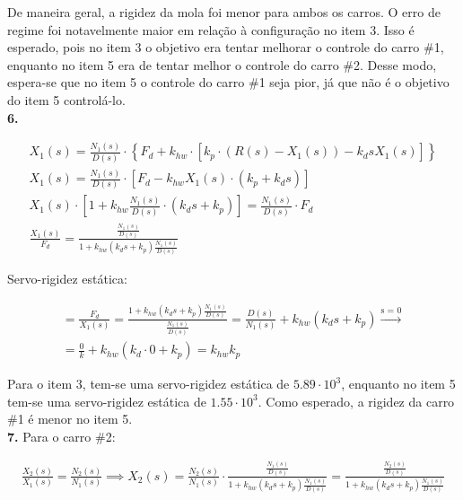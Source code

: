 \documentclass[a4paper,11pt]{article}
\begin{document}
De maneira geral, a rigidez da mola foi menor para ambos os carros. O erro de
regime foi notavelmente maior em relação à configuração no item 3. Isso é
esperado, pois no item 3 o objetivo era tentar melhorar o controle do carro \#1,
enquanto no item 5 era de tentar melhor o controle do carro \#2. Desse modo,
espera-se que no item 5 o controle do carro \#1 seja pior, já que não é o
objetivo do item 5 controlá-lo. \\

\textbf{6.}

\begin{gather*}
  X_1\left(s\right) = \frac{N_1\left(s\right)}{D\left(s\right)} \cdot \left\{
    F_d + k_{hw} \cdot \left[k_p \cdot \left(R\left(s\right) - X_1\left(s\right)
    \right) - k_d s X_1\left(s\right)\right]\right\} \\
  X_1\left(s\right) = \frac{N_1\left(s\right)}{D\left(s\right)} \cdot \left[
    F_d - k_{hw} X_1 \left(s\right) \cdot \left(k_p + k_d s\right)\right] \\
  X_1\left(s\right) \cdot \left[1 + k_{hw}
    \frac{N_1\left(s\right)}{D\left(s\right)} \cdot \left(k_d s + k_p\right)
    \right] = \frac{N_1\left(s\right)}{D\left(s\right)} \cdot F_d \\
  \frac{X_1\left(s\right)}{F_d} = \frac{
    \frac{N_1\left(s\right)}{D\left(s\right)}}{1 + k_{hw} \left(k_d s +
    k_p\right) \frac{N_1\left(s\right)}{D\left(s\right)}}
\end{gather*}

Servo-rigidez estática:

\begin{gather*}
  = \frac{F_d}{X_1\left(s\right)} = \frac{1 + k_{hw} \left(k_d s + k_p\right)
    \frac{N_1\left(s\right)}{D\left(s\right)}}
    {\frac{N_1\left(s\right)}{D\left(s\right)}} =
    \frac{D\left(s\right)}{N_1\left(s\right)} + k_{hw}
    \left(k_d s + k_p\right) \xrightarrow{\text{s = 0}} \\
  = \frac{0}{k} + k_{hw} \left(k_d \cdot 0 + k_p\right) = k_{hw} k_p
\end{gather*}

Para o item 3, tem-se uma servo-rigidez estática de $5.89 \cdot 10^3$,
enquanto no item 5 tem-se uma servo-rigidez estática de $1.55 \cdot 10^3$.
Como esperado, a rigidez da carro \#1 é menor no item 5. \\

\textbf{7.}
Para o carro \#2:

\begin{gather*}
  \frac{X_2\left(s\right)}{X_1\left(s\right)} = \frac{N_2\left(s\right)}
    {N_1\left(s\right)} \implies X_2\left(s\right) =
    \frac{N_2\left(s\right)}{N_1\left(s\right)} \cdot \frac{
    \frac{N_1\left(s\right)}{D\left(s\right)}}{1 + k_{hw} \left(k_d s +
    k_p\right) \frac{N_1\left(s\right)}{D\left(s\right)}} =
    \frac{\frac{N_2\left(s\right)}{D\left(s\right)}}{1 + k_{hw} \left(k_d s +
    k_p\right) \frac{N_1\left(s\right)}{D\left(s\right)}}
\end{gather*}
\end{document}
